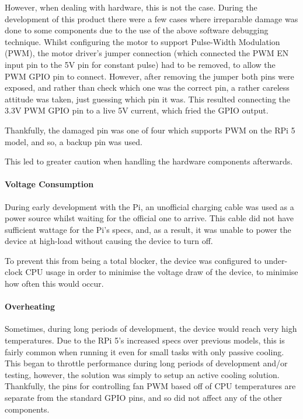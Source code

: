                     However, when dealing with hardware, this is not the case. During the development of this product there were a few cases where irreparable damage was done to some components due to the use of the above software debugging technique. Whilst configuring the motor to support Pulse-Width Modulation (PWM), the motor driver's jumper connection (which connected the PWM EN input pin to the 5V pin for constant pulse) had to be removed, to allow the PWM GPIO pin to connect. However, after removing the jumper both pins were exposed, and rather than check which one was the correct pin, a rather careless attitude was taken, just guessing which pin it was. This resulted connecting the 3.3V PWM GPIO pin to a live 5V current, which fried the GPIO output.
    
                    Thankfully, the damaged pin was one of four which supports PWM on the RPi 5 model, and so, a backup pin was used.
    
                    This led to greater caution when handling the hardware components afterwards.
    
                \paragraph{Voltage Consumption}
    
                    During early development with the Pi, an unofficial charging cable was used as a power source whilst waiting for the official one to arrive. This cable did not have sufficient wattage for the Pi's specs, and, as a result, it was unable to power the device at high-load without causing the device to turn off.
    
                    To prevent this from being a total blocker, the device was configured to under-clock CPU usage in order to minimise the voltage draw of the device, to minimise how often this would occur.
    
                \paragraph{Overheating}
    
                    Sometimes, during long periods of development, the device would reach very high temperatures. Due to the RPi 5's increased specs over previous models, this is fairly common when running it even for small tasks with only passive cooling. This began to throttle performance during long periods of development and/or testing, however, the solution was simply to setup an active cooling solution. Thankfully, the pins for controlling fan PWM based off of CPU temperatures are separate from the standard GPIO pins, and so did not affect any of the other components.
    
